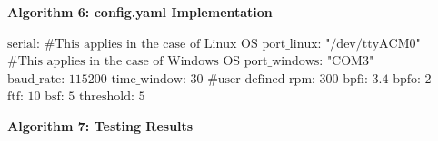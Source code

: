 \clearpage



\noindent\textbf{Algorithm 6: config.yaml Implementation}

\begin{algorithmic}[1]
	\STATE $\text{serial:}$
	\STATE \hspace{0.5cm} $\text{\# This applies in the case of Linux OS}$
	\STATE \hspace{0.5cm} $\text{port\_linux: "/dev/ttyACM0"}$
	\STATE \hspace{0.5cm} $\text{\# This applies in the case of Windows OS}$
	\STATE \hspace{0.5cm} $\text{port\_windows: "COM3"}$
	\STATE \hspace{0.5cm} $\text{baud\_rate: 115200}$
	\STATE $\text{time\_window: 30}$
	\STATE $\text{\# user defined}$
	\STATE $\text{rpm: 300}$
	\STATE $\text{bpfi: 3.4}$
	\STATE $\text{bpfo: 2}$
	\STATE $\text{ftf: 10}$
	\STATE $\text{bsf: 5}$
	\STATE $\text{threshold: 5}$
\end{algorithmic}

\clearpage




\noindent\textbf{Algorithm 7: Testing Results}


